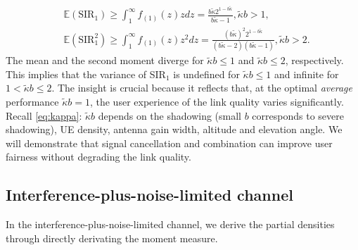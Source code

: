\documentclass[lettersize,journal]{IEEEtran}
\begin{document}
\begin{align}
  &\mathbb{E}(\text{SIR}_1)  \geq\int_{1}^{\infty}f_{(1)}(z)zdz=\frac{b \tilde{\kappa}  2^{1-b \tilde{\kappa} }}{b \tilde{\kappa} -1}, \tilde{\kappa}b >1, \\
  &\mathbb{E}(\text{SIR}^2_1) \geq \int_{1}^{\infty}f_{(1)}(z)z^2dz = \frac{(b \tilde{\kappa}) ^2 2^{1-b \tilde{\kappa} }}{(b\tilde{\kappa} - 2)  (b\tilde{\kappa} - 1)},\tilde{\kappa}b >2.
\end{align}
The mean and the second moment diverge for $\tilde{\kappa}b\leq 1$ and $\tilde{\kappa}b\leq 2$, respectively. This implies that the variance of SIR$_1$ is undefined for $\tilde{\kappa}b \leq 1$ and infinite for $1 <\tilde{\kappa}b \leq 2$. The insight is crucial because it reflects that, at the optimal \textit{average} performance $\tilde{\kappa}b = 1$, the user experience of the link quality varies significantly. Recall \eqref{eq:kappa}: $\tilde{\kappa}b$ depends on the shadowing (small $b$ corresponds to severe shadowing), UE density, antenna gain width, altitude and elevation angle. We will demonstrate that signal cancellation and combination can improve user fairness without degrading the link quality.






\subsection{Interference-plus-noise-limited channel}


In the interference-plus-noise-limited channel, we derive the partial densities through directly derivating the moment measure.
\end{document}
